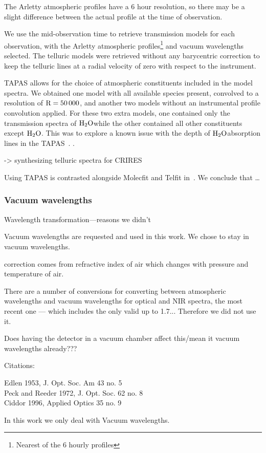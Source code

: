 The Arletty atmospheric profiles have a 6 hour resolution, so there may be a slight difference between the actual profile at the time of observation.

We use the mid-observation time to retrieve transmission models for each observation, with the Arletty atmospheric profiles\footnote{Nearest of the 6 hourly profiles} and vacuum wavelengths selected. The telluric models were retrieved without any barycentric correction to keep the telluric lines at a radial velocity of zero with respect to the instrument.

TAPAS allows for the choice of atmospheric constituents included in the model spectra. We obtained one model with all available species present, convolved to a resolution of \(\rm R=50\,000\), and another two models without an instrumental profile convolution applied. For these two extra models, one contained only the transmission spectra of \(\rm H_{2}O\)while the other contained all other constituents except \(\rm H_{2}O\). This was to explore a known issue with the depth of \(\rm H_{2}O\)absorption lines in the TAPAS~\citet{bertaux_tapas_2014}. .


 -> synthesizing telluric spectra \nir{} for CRIRES~\cite{seifahrt_synthesising_2010}

Using TAPAS is contrasted alongside Molecfit and Telfit in~\cite{ulmer-moll_telluric_2018}. We conclude that \ldots



\subsubsection{Vacuum wavelengths}

Wavelength transformation---reasons we didn't

Vacuum wavelengths are requested and used in this work.
We chose to stay in vacuum wavelengths.

correction comes from refractive index of air which changes with pressure and temperature of air.

There are a number of conversions for converting between atmospheric wavelengths and vacuum wavelengths for optical and NIR spectra, the most recent one --- which includes the \nir{} only valid up to 1.7\um{}...
Therefore we did not use it. 

Does having the detector in a vacuum chamber affect this/mean it vacuum wavelengths already???

Citations:

Edlen 1953, J. Opt. Soc. Am 43 no. 5\\
Peck and Reeder 1972, J. Opt. Soc. 62 no. 8\\
Ciddor 1996, Applied Optics 35 no. 9


In this work we only deal with Vacuum wavelengths.
